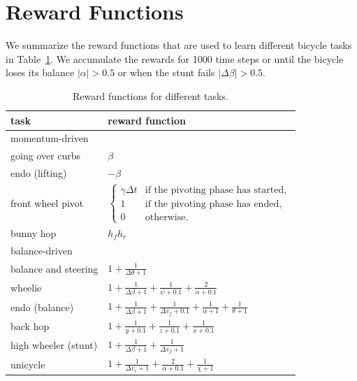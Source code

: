 \section{Reward Functions}
We summarize the reward functions that are used to learn different bicycle tasks in Table~\ref{table:rewardFunction}. We accumulate the rewards for 1000 time steps or until the bicycle loses its balance $|\alpha|>0.5$ or when the stunt fails $|\Delta \beta|>0.5$.
\begin{table}[ht]
\vspace{-0.1in}
\centering
\begin{tabular}{|l|l|}
\hline
task & reward function\\
\hline
momentum-driven & \\
\hline
going over curbs      & $\beta$ \\
endo (lifting)        & $-\beta$ \\
front wheel pivot     & $ \left\{ \begin{array}{ll} \dot{\gamma} \Delta t & \textrm{if the pivoting phase has started,}\\ 1 & \textrm{if the pivoting phase has ended,} \\ 0 & \textrm{otherwise.} \end{array} \right. $\\
bunny hop             & $h_fh_r$\\
\hline
balance-driven & \\
\hline
balance and steering  & $1 + \frac{1}{\Delta \theta+1}$ \\
wheelie               & $1 + \frac{1}{\Delta \beta + 1} + \frac{1}{\psi + 0.1} + \frac{2}{\alpha + 0.1}$ \\
endo (balance)        & $1 + \frac{1}{\Delta \beta + 1} + \frac{1}{\Delta v_f + 0.1} + \frac{1}{\alpha + 1} + \frac{1}{\theta + 1}$ \\
back hop              & $1 + \frac{1}{y + 0.1} + \frac{1}{z + 0.1} + \frac{1}{x + 0.1}$\\
high wheeler (stunt)  & $1 + \frac{1}{\Delta \beta + 1} + \frac{1}{\Delta v_f + 1} $\\
unicycle              & $1 + \frac{1}{\Delta v_r + 1} + \frac{2}{\alpha + 0.1} + \frac{1}{\chi + 1}$\\
\hline
 \end{tabular}
 \caption{Reward functions for different tasks. }
 \vspace{-0.1in}
 \label{table:rewardFunction}
 \end{table}

